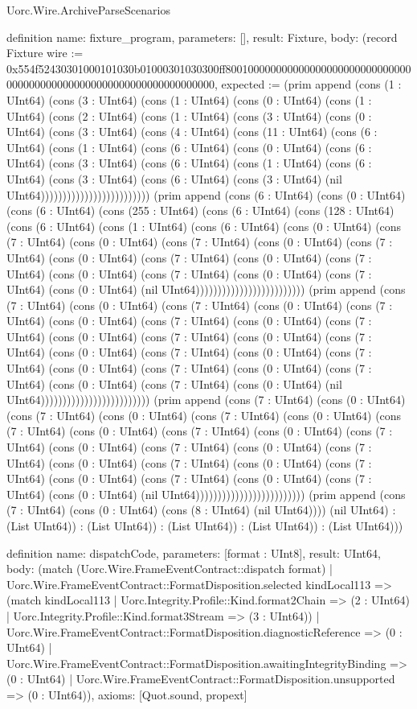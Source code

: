 \begin{lexlean}{Uorc.Wire.ArchiveParseScenarios}
\begin{semanticmodule}
definition{
  name: fixture_program,
  parameters: [],
  result: Fixture,
  body: (record Fixture {wire := 0x554f52430301000101030b01000301030300ff8001000000000000000000000000000000000000000000000000000000000000000000, expected := (prim append (cons (1 : UInt64) (cons (3 : UInt64) (cons (1 : UInt64) (cons (0 : UInt64) (cons (1 : UInt64) (cons (2 : UInt64) (cons (1 : UInt64) (cons (3 : UInt64) (cons (0 : UInt64) (cons (3 : UInt64) (cons (4 : UInt64) (cons (11 : UInt64) (cons (6 : UInt64) (cons (1 : UInt64) (cons (6 : UInt64) (cons (0 : UInt64) (cons (6 : UInt64) (cons (3 : UInt64) (cons (6 : UInt64) (cons (1 : UInt64) (cons (6 : UInt64) (cons (3 : UInt64) (cons (6 : UInt64) (cons (3 : UInt64) (nil UInt64))))))))))))))))))))))))) (prim append (cons (6 : UInt64) (cons (0 : UInt64) (cons (6 : UInt64) (cons (255 : UInt64) (cons (6 : UInt64) (cons (128 : UInt64) (cons (6 : UInt64) (cons (1 : UInt64) (cons (6 : UInt64) (cons (0 : UInt64) (cons (7 : UInt64) (cons (0 : UInt64) (cons (7 : UInt64) (cons (0 : UInt64) (cons (7 : UInt64) (cons (0 : UInt64) (cons (7 : UInt64) (cons (0 : UInt64) (cons (7 : UInt64) (cons (0 : UInt64) (cons (7 : UInt64) (cons (0 : UInt64) (cons (7 : UInt64) (cons (0 : UInt64) (nil UInt64))))))))))))))))))))))))) (prim append (cons (7 : UInt64) (cons (0 : UInt64) (cons (7 : UInt64) (cons (0 : UInt64) (cons (7 : UInt64) (cons (0 : UInt64) (cons (7 : UInt64) (cons (0 : UInt64) (cons (7 : UInt64) (cons (0 : UInt64) (cons (7 : UInt64) (cons (0 : UInt64) (cons (7 : UInt64) (cons (0 : UInt64) (cons (7 : UInt64) (cons (0 : UInt64) (cons (7 : UInt64) (cons (0 : UInt64) (cons (7 : UInt64) (cons (0 : UInt64) (cons (7 : UInt64) (cons (0 : UInt64) (cons (7 : UInt64) (cons (0 : UInt64) (nil UInt64))))))))))))))))))))))))) (prim append (cons (7 : UInt64) (cons (0 : UInt64) (cons (7 : UInt64) (cons (0 : UInt64) (cons (7 : UInt64) (cons (0 : UInt64) (cons (7 : UInt64) (cons (0 : UInt64) (cons (7 : UInt64) (cons (0 : UInt64) (cons (7 : UInt64) (cons (0 : UInt64) (cons (7 : UInt64) (cons (0 : UInt64) (cons (7 : UInt64) (cons (0 : UInt64) (cons (7 : UInt64) (cons (0 : UInt64) (cons (7 : UInt64) (cons (0 : UInt64) (cons (7 : UInt64) (cons (0 : UInt64) (cons (7 : UInt64) (cons (0 : UInt64) (nil UInt64))))))))))))))))))))))))) (prim append (cons (7 : UInt64) (cons (0 : UInt64) (cons (8 : UInt64) (nil UInt64)))) (nil UInt64) : (List UInt64)) : (List UInt64)) : (List UInt64)) : (List UInt64)) : (List UInt64))})
}

definition{
  name: dispatchCode,
  parameters: [format : UInt8],
  result: UInt64,
  body: (match (Uorc.Wire.FrameEventContract::dispatch format)
    | Uorc.Wire.FrameEventContract::FormatDisposition.selected kindLocal113 => (match kindLocal113
      | Uorc.Integrity.Profile::Kind.format2Chain => (2 : UInt64)
      | Uorc.Integrity.Profile::Kind.format3Stream => (3 : UInt64))
    | Uorc.Wire.FrameEventContract::FormatDisposition.diagnosticReference => (0 : UInt64)
    | Uorc.Wire.FrameEventContract::FormatDisposition.awaitingIntegrityBinding => (0 : UInt64)
    | Uorc.Wire.FrameEventContract::FormatDisposition.unsupported => (0 : UInt64)),
  axioms: [Quot.sound, propext]
}


\end{semanticmodule}
\end{lexlean}
